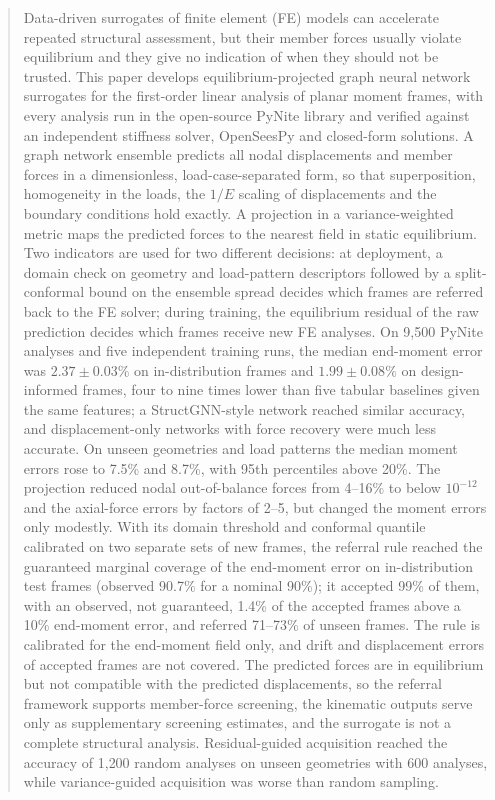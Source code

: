 \begin{abstract}
Data-driven surrogates of finite element (FE) models can accelerate repeated structural assessment, but their member forces usually violate equilibrium and they give no indication of when they should not be trusted. This paper develops equilibrium-projected graph neural network surrogates for the first-order linear analysis of planar moment frames, with every analysis run in the open-source PyNite library and verified against an independent stiffness solver, OpenSeesPy and closed-form solutions. A graph network ensemble predicts all nodal displacements and member forces in a dimensionless, load-case-separated form, so that superposition, homogeneity in the loads, the $1/E$ scaling of displacements and the boundary conditions hold exactly. A projection in a variance-weighted metric maps the predicted forces to the nearest field in static equilibrium. Two indicators are used for two different decisions: at deployment, a domain check on geometry and load-pattern descriptors followed by a split-conformal bound on the ensemble spread decides which frames are referred back to the FE solver; during training, the equilibrium residual of the raw prediction decides which frames receive new FE analyses. On 9{,}500 PyNite analyses and five independent training runs, the median end-moment error was $2.37\pm0.03\%$ on in-distribution frames and $1.99\pm0.08\%$ on design-informed frames, four to nine times lower than five tabular baselines given the same features; a StructGNN-style network reached similar accuracy, and displacement-only networks with force recovery were much less accurate. On unseen geometries and load patterns the median moment errors rose to 7.5\% and 8.7\%, with 95th percentiles above 20\%. The projection reduced nodal out-of-balance forces from 4--16\% to below $10^{-12}$ and the axial-force errors by factors of 2--5, but changed the moment errors only modestly. With its domain threshold and conformal quantile calibrated on two separate sets of new frames, the referral rule reached the guaranteed marginal coverage of the end-moment error on in-distribution test frames (observed 90.7\% for a nominal 90\%); it accepted 99\% of them, with an observed, not guaranteed, 1.4\% of the accepted frames above a 10\% end-moment error, and referred 71--73\% of unseen frames. The rule is calibrated for the end-moment field only, and drift and displacement errors of accepted frames are not covered. The predicted forces are in equilibrium but not compatible with the predicted displacements, so the referral framework supports member-force screening, the kinematic outputs serve only as supplementary screening estimates, and the surrogate is not a complete structural analysis. Residual-guided acquisition reached the accuracy of 1{,}200 random analyses on unseen geometries with 600 analyses, while variance-guided acquisition was worse than random sampling.
\end{abstract}
